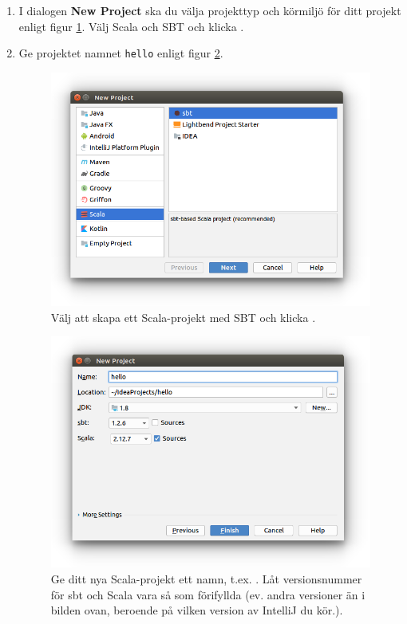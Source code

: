 \begin{enumerate}
\item I dialogen \textbf{New Project} ska du välja projekttyp och körmiljö för ditt projekt enligt figur \ref{fig:idea:new-project}. Välj Scala och SBT och klicka .

\item Ge projektet namnet \texttt{hello} enligt figur \ref{fig:idea:new-hello-project}.

\begin{figure}[h]
\centering
\includegraphics[width=1.0\textwidth]{../img/intellij/idea-new-scala-project.png}
\caption{Välj att skapa ett Scala-projekt med SBT och klicka .}
\label{fig:idea:new-project}
\end{figure}

\begin{figure}[h]
\centering
\includegraphics[width=1.0\textwidth]{../img/intellij/idea-new-hello-project.png}
\caption{Ge ditt nya Scala-projekt ett namn, t.ex. . Låt versionsnummer för sbt och Scala vara så som förifyllda (ev. andra versioner än i bilden ovan, beroende på vilken version av IntelliJ du kör.). \label{fig:idea:new-hello-project}}


\end{figure}
\end{enumerate}
